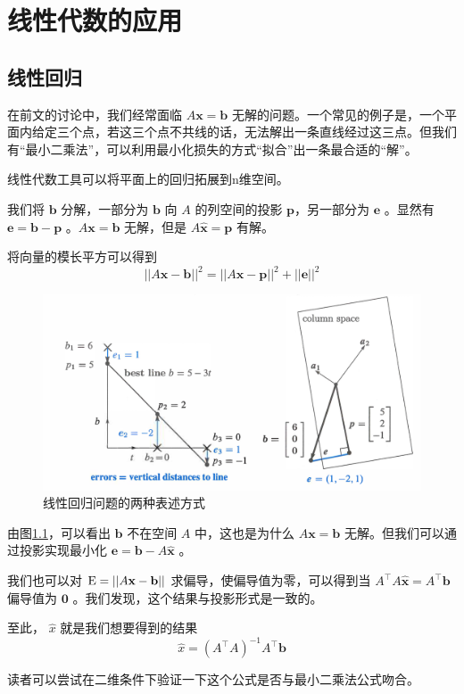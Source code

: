 \chapter{线性代数的应用}
\section{线性回归}

在前文的讨论中，我们经常面临 $A\mathbf x=\mathbf b$ 无解的问题。一个常见的例子是，一个平面内给定三个点，若这三个点不共线的话，无法解出一条直线经过这三点。但我们有“最小二乘法”，可以利用最小化损失的方式“拟合”出一条最合适的“解”。

线性代数工具可以将平面上的回归拓展到n维空间。

我们将 $\mathbf b$ 分解，一部分为 $\mathbf b$ 向 $A$ 的列空间的投影 $\mathbf p$，另一部分为 $\mathbf e$ 。显然有 $\mathbf e=\mathbf b-\mathbf p$ 。$A\mathbf x=\mathbf b$ 无解，但是 $A\hat{\mathbf{x}}=\mathbf p$ 有解。

将向量的模长平方可以得到
$$
||A\mathbf x-\mathbf b||^2=||A\mathbf x-\mathbf p||^2+||\mathbf e||^2
$$

\begin{figure}
	\centering
	\includegraphics[width=0.7\linewidth]{../img/screenshot003}
	\caption{线性回归问题的两种表述方式}
	\label{image_linead_approx}
\end{figure}

由图\ref{image_linead_approx}，可以看出 $\mathbf b$ 不在空间 $A$ 中，这也是为什么 $A\mathbf x =\mathbf b$ 无解。但我们可以通过投影实现最小化 $\mathbf e=\mathbf b-A\hat{\mathbf x}$ 。

我们也可以对 $\text E=||A\mathbf x -\mathbf b||$ 求偏导，使偏导值为零，可以得到当 $A^\top A\hat{\mathbf x}=A^\top\mathbf b$ 偏导值为 $\mathbf 0$ 。我们发现，这个结果与投影形式是一致的。

至此， $\hat x$ 就是我们想要得到的结果
$$
\hat x=(A^\top A)^{-1}A^\top\mathbf b
$$

读者可以尝试在二维条件下验证一下这个公式是否与最小二乘法公式吻合。

